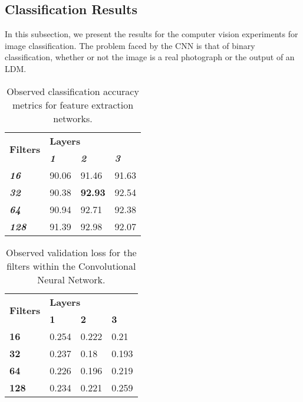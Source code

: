 \documentclass{article}
\begin{document}
\subsection{Classification Results}
In this subsection, we present the results for the computer vision experiments for image classification. The problem faced by the CNN is that of binary classification, whether or not the image is a real photograph or the output of an LDM. 


\begin{table}[] \footnotesize
\centering
\caption{Observed classification accuracy metrics for feature extraction networks. }
\label{tab:cnn-acc}
\begin{tabular}{@{}llll@{}}
\toprule
\multirow{2}{*}{\textbf{Filters}} & \multicolumn{3}{l}{\textbf{Layers}}                             \\ \cmidrule(l){2-4} 
                                  & \textit{\textbf{1}} & \textit{\textbf{2}} & \textit{\textbf{3}} \\ \cmidrule(r){1-1}
\textit{\textbf{16}}              & 90.06               & 91.46               & 91.63               \\
\textit{\textbf{32}}              & 90.38               & \textbf{92.93}      & 92.54               \\
\textit{\textbf{64}}              & 90.94               & 92.71               & 92.38               \\
\textit{\textbf{128}}             & 91.39               & 92.98               & 92.07               \\ \bottomrule
\end{tabular}
\end{table}

\begin{table}[] \footnotesize
\centering
\caption{Observed validation loss for the filters within the Convolutional Neural Network.}
\label{tab:cnn-loss}
\begin{tabular}{@{}llll@{}}
\toprule
\multirow{2}{*}{\textbf{Filters}} & \multicolumn{3}{l}{\textbf{Layers}}  \\ \cmidrule(l){2-4} 
                                  & \textbf{1} & \textbf{2} & \textbf{3} \\ \cmidrule(r){1-1}
\textbf{16}                       & 0.254      & 0.222      & 0.21       \\
\textbf{32}                       & 0.237      & 0.18       & 0.193      \\
\textbf{64}                       & 0.226      & 0.196      & 0.219      \\
\textbf{128}                      & 0.234      & 0.221      & 0.259     
         \\ \bottomrule
\end{tabular}
\end{table}
\end{document}
